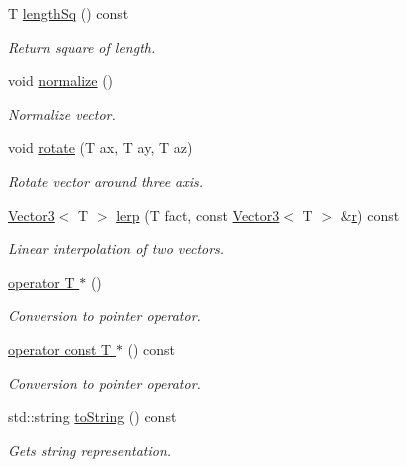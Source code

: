 \begin{DoxyCompactItemize}
T \hyperlink{class_vector3_a750daa261b3ffc5fc3491c31c8bbadd2}{lengthSq} () const 
\begin{DoxyCompactList}\small\item\em Return square of length. \item\end{DoxyCompactList}\item 
void \hyperlink{class_vector3_a9b147a862a1b86ed2e5b735d19da3da1}{normalize} ()
\begin{DoxyCompactList}\small\item\em Normalize vector. \item\end{DoxyCompactList}\item 
void \hyperlink{class_vector3_a1f827732a85e05b2ef2b8f00145fb2af}{rotate} (T ax, T ay, T az)
\begin{DoxyCompactList}\small\item\em Rotate vector around three axis. \item\end{DoxyCompactList}\item 
\hyperlink{class_vector3}{Vector3}$<$ T $>$ \hyperlink{class_vector3_a05d0f18d40f03e9dd98970de80e209f5}{lerp} (T fact, const \hyperlink{class_vector3}{Vector3}$<$ T $>$ \&\hyperlink{class_vector3_add6ab48cc3cc8636e4f043caa8824dff}{r}) const 
\begin{DoxyCompactList}\small\item\em Linear interpolation of two vectors. \item\end{DoxyCompactList}\item 
\hyperlink{class_vector3_a8303ebc00016d1fd5923b94b520b19a4}{operator T $\ast$} ()
\begin{DoxyCompactList}\small\item\em Conversion to pointer operator. \item\end{DoxyCompactList}\item 
\hyperlink{class_vector3_a289fabaf4a3f93c3305f003b4ab85ee5}{operator const T $\ast$} () const 
\begin{DoxyCompactList}\small\item\em Conversion to pointer operator. \item\end{DoxyCompactList}\item 
std::string \hyperlink{class_vector3_ae3819967ed3e79fe402ed4340910b8e4}{toString} () const 
\begin{DoxyCompactList}\small\item\em Gets string representation. \item\end{DoxyCompactList}\end{DoxyCompactItemize}
